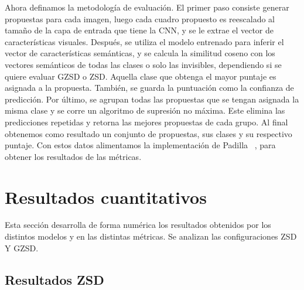 Ahora definamos la metodología de evaluación. El primer paso consiste generar propuestas para cada imagen, luego cada cuadro propuesto es reescalado al tamaño de la capa de entrada que tiene la CNN, y se le extrae el vector de características visuales. Después, se utiliza el modelo entrenado para inferir el vector de características semánticas, y se calcula la similitud coseno con los vectores semánticos de todas las clases o solo las invisibles, dependiendo si se quiere evaluar GZSD o ZSD. Aquella clase que obtenga el mayor puntaje es asignada a la propuesta. También, se guarda la puntuación como la confianza de predicción.  Por último, se agrupan todas las propuestas que se tengan asignada la misma clase y se corre un algoritmo de supresión no máxima. Este elimina las predicciones repetidas y retorna las mejores propuestas de cada grupo. Al final obtenemos como resultado un conjunto de propuestas, sus clases y su respectivo puntaje. Con estos datos alimentamos la implementación de Padilla \etal~\cite{padilla2020survey}, para obtener los resultados de las métricas.

\section{Resultados cuantitativos} \label{sec:resultadoscuantitativos}

Esta sección desarrolla de forma numérica los resultados obtenidos por los distintos modelos y en las distintas métricas. Se analizan las configuraciones ZSD Y GZSD.

\subsection{Resultados ZSD}

